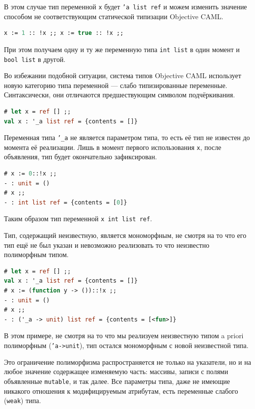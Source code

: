 В этом случае тип переменной \texttt{х} будет \texttt{'a list ref} и можем
изменить значение способом не соответствующим статической типизации Objective
CAML.

\begin{lstlisting}[language=OCaml]
x := 1 :: !x ;; x := true :: !x ;;
\end{lstlisting}

При этом получаем одну и ту же переменную типа \texttt{int list} в один момент и
\texttt{bool list} в другой.

Во избежании подобной ситуации, система типов Objective CAML использует новую
категорию типа переменной --- слабо типизированные переменные. Синтаксически,
они отличаются предшествующим символом подчёркивания.

\begin{lstlisting}[language=OCaml]
# let x = ref [] ;;
val x : '_a list ref = {contents = []}
\end{lstlisting}

Переменная типа \texttt{'\_a} не является параметром типа, то есть её тип не
известен до момента её реализации. Лишь в момент первого использования
\texttt{x}, после объявления, тип будет окончательно зафиксирован.

\begin{lstlisting}[language=OCaml]
# x := 0::!x ;;
- : unit = ()
# x ;;
- : int list ref = {contents = [0]}
\end{lstlisting}

Таким образом тип переменной \texttt{x int list ref}.

Тип, содержащий неизвестную, является мономорфным, не смотря на то что его тип
ещё не был указан и невозможно реализовать то что неизвестно полиморфным типом.

\begin{lstlisting}[language=OCaml]
# let x = ref [] ;;
val x : '_a list ref = {contents = []}
# x := (function y -> ())::!x ;;
- : unit = ()
# x ;;
- : ('_a -> unit) list ref = {contents = [<fun>]}
\end{lstlisting}

В этом примере, не смотря на то что мы реализуем неизвестную типом a priori
полиморфным (\texttt{'a->unit}), тип остался мономорфным с новой неизвестной
типа.

Это ограничение полиморфизма распространяется не только на указатели, но и на
любое значение содержащее изменяемую часть: массивы, записи с полями объявленные
\texttt{mutable}, и так далее. Все параметры типа, даже не имеющие никакого
отношения к модифицируемым атрибутам, есть переменные слабого (\texttt{weak})
типа.

